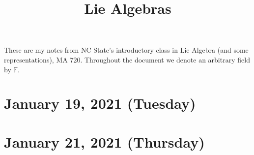 \documentclass{pranav}
\title{Lie Algebras}
\begin{document}
\maketitle
These are my notes from NC State's introductory class in Lie Algebra (and some representations), MA 720. Throughout the document we denote an arbitrary field by $\mathbb{F}$. 

\tableofcontents
\newpage

\section{January 19, 2021 (Tuesday)}

\section{January 21, 2021 (Thursday)}


\end{document}
